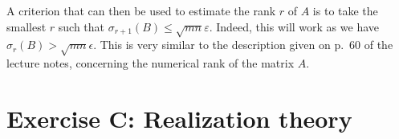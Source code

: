 \documentclass[11pt]{article}
\newcommand{\snorm}[1]{\norm{#1}_2} %
\begin{document}
A criterion that can then be used to estimate the rank \(r\) of \(A\) is to take the smallest \(r\) such that \(\sigma_{r + 1}(B) \leqslant \sqrt{mn} \varepsilon\). Indeed, this will work as we have $\sigma_r(B)> \sqrt{mn}\epsilon$.
This is very similar to the description given on p.~60 of the lecture notes, concerning the numerical rank of the matrix \(A\). 

\section*{Exercise C: Realization theory}
\end{document}
